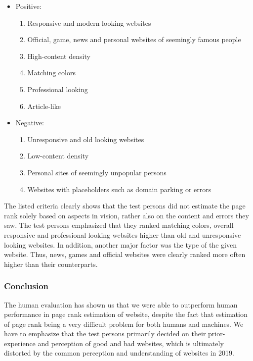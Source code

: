 \begin{itemize}
	\item Positive: \begin{enumerate}
	 \item Responsive and modern looking websites
	 \item Official, game, news and personal websites of seemingly famous people
	 \item High-content density
	 \item Matching colors
	 \item Professional looking
	 \item Article-like
	\end{enumerate}
	\item Negative: \begin{enumerate}
	\item Unresponsive and old looking websites
	\item Low-content density
	\item Personal sites of seemingly unpopular persons
	\item Websites with placeholders such as domain parking or errors
	\end{enumerate}
\end{itemize}

The listed criteria clearly shows that the test persons did not estimate the page rank solely based on aspects in vision, rather also on the content and errors they saw. The test persons emphasized that they ranked matching colors, overall responsive and professional looking websites higher than old and unresponsive looking websites. In addition, another major factor was the type of the given website. Thus, news, games and official websites were clearly ranked more often higher than their counterparts.

\subsubsection{Conclusion}
The human evaluation has shown us that we were able to outperform human performance in page rank estimation of website, despite the fact that estimation of page rank being a very difficult problem for both humans and machines. We have to emphasize that the test persons primarily decided on their prior-experience and perception of good and bad websites, which is ultimately distorted by the common perception and understanding of websites in 2019.